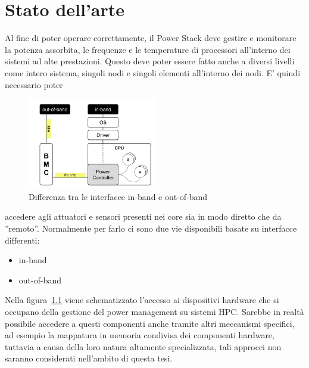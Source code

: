 
\chapter{Stato dell'arte}
Al fine di poter operare correttamente, il Power Stack deve gestire e monitorare la potenza assorbita, le frequenze e le temperature di processori all'interno dei sistemi ad alte prestazioni. Questo deve poter essere fatto anche a diversi livelli come intero sistema, singoli nodi e singoli elementi all'interno dei nodi. E' quindi necessario poter 
\setlength{\intextsep}{1pt} 
\begin{figure}
    \includegraphics[width=0.5\textwidth]{img/SoA.png}
    \centering
    \caption{Differenza tra le interfacce in-band e out-of-band}\label{fig:SoAinoutband}
\end{figure}
accedere agli attuatori e sensori presenti nei core sia in modo diretto che da ''remoto''. Normalmente per farlo ci sono due vie disponibili basate su interfacce differenti:
\begin{itemize}
    \item in-band
    \item out-of-band
\end{itemize}
Nella figura~\ref{fig:SoAinoutband} viene schematizzato l'accesso ai dispositivi hardware che si occupano della gestione del power management su sistemi HPC. Sarebbe in realtà possibile accedere a questi componenti anche tramite altri meccanismi specifici, ad esempio la mappatura in memoria condivisa dei componenti hardware, tuttavia a causa della loro natura altamente specializzata, tali approcci non saranno considerati nell'ambito di questa tesi.


